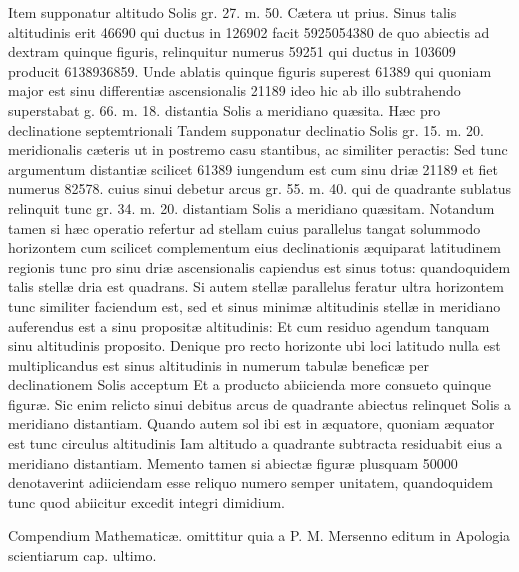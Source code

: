 \documentclass[11pt,a4paper]{article}
\begin{document}
Item supponatur altitudo Solis gr. 27. m. 50. Cætera ut
prius. Sinus talis altitudinis erit 46690 qui ductus in
126902 facit 5925054380 de quo abiectis ad dextram
quinque figuris, relinquitur numerus 59251 qui ductus
in 103609 producit 6138936859. Unde ablatis quinque
figuris superest 61389 qui quoniam major est sinu differentiæ
ascensionalis 21189 ideo hic ab illo subtrahendo
superstabat g. 66. m. 18. distantia Solis a meridiano quæsita.
Hæc pro declinatione septemtrionali Tandem supponatur
declinatio Solis gr. 15. m. 20. meridionalis cæteris ut in
postremo casu stantibus, ac similiter peractis: Sed tunc
argumentum distantiæ scilicet 61389 iungendum est
cum sinu driæ 21189 et fiet numerus 82578. cuius sinui
debetur arcus gr. 55. m. 40. qui de quadrante sublatus
relinquit tunc gr. 34. m. 20. distantiam Solis a meridiano
quæsitam. Notandum tamen si hæc operatio refertur
ad stellam cuius parallelus tangat solummodo horizontem
cum scilicet complementum eius declinationis æquiparat
latitudinem regionis tunc pro sinu driæ ascensionalis
capiendus est sinus totus: quandoquidem talis stellæ dria
est quadrans. Si autem stellæ parallelus feratur ultra
horizontem tunc similiter faciendum est, sed et sinus
minimæ altitudinis stellæ in meridiano auferendus est
a sinu propositæ altitudinis: Et cum residuo agendum tanquam
sinu altitudinis proposito. Denique pro recto horizonte ubi loci
latitudo nulla est multiplicandus est sinus altitudinis
in numerum tabulæ beneficæ per declinationem Solis acceptum
Et a producto abiicienda more consueto quinque figuræ.
Sic enim relicto sinui debitus arcus de quadrante abiectus
relinquet Solis a meridiano distantiam. Quando autem sol
ibi est in æquatore, quoniam æquator est tunc circulus altitudinis
Iam altitudo a quadrante subtracta residuabit eius
a meridiano distantiam. Memento tamen si abiectæ figuræ
plusquam 50000 denotaverint adiiciendam esse reliquo numero
semper unitatem, quandoquidem tunc quod abiicitur excedit
integri dimidium.

Compendium Mathematicæ. omittitur quia
a P. M. Mersenno editum in Apologia scientiarum cap. ultimo.
\end{document}
